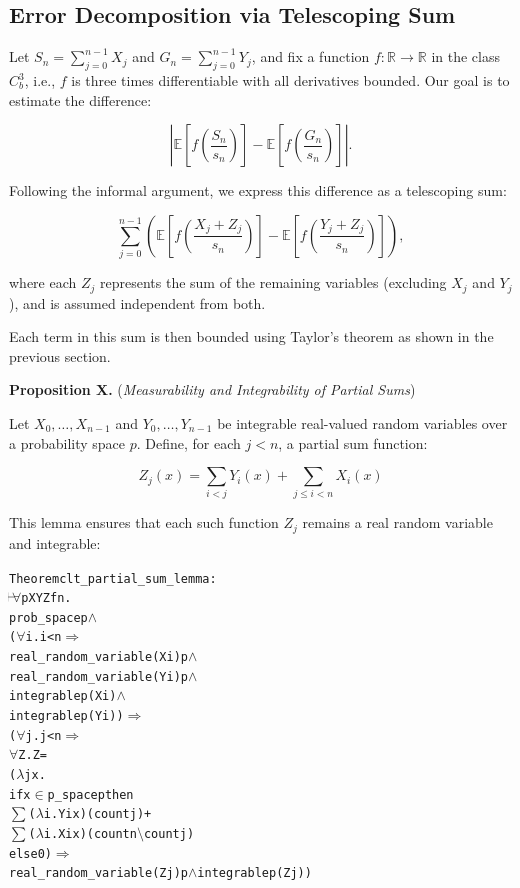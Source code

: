 \subsection{Error Decomposition via Telescoping Sum}

Let $S_n = \sum_{j=0}^{n-1} X_j$ and $G_n = \sum_{j=0}^{n-1} Y_j$, and fix a function $f : \mathbb{R} \to \mathbb{R}$ in the class $C^3_b$, i.e., $f$ is three times differentiable with all derivatives bounded. Our goal is to estimate the difference:

\[
\left| \mathbb{E}\left[f\left(\frac{S_n}{s_n}\right)\right]
     - \mathbb{E}\left[f\left(\frac{G_n}{s_n}\right)\right] \right|.
\]

Following the informal argument, we express this difference as a telescoping sum:

\[
\sum_{j=0}^{n-1} \left(
\mathbb{E}\left[f\left(\frac{X_j + Z_j}{s_n}\right)\right]
-
\mathbb{E}\left[f\left(\frac{Y_j + Z_j}{s_n}\right)\right]
\right),
\]

where each $Z_j$ represents the sum of the remaining variables (excluding $X_j$ and $Y_j$), and is assumed independent from both.

Each term in this sum is then bounded using Taylor's theorem as shown in the previous section.

\textbf{Proposition X.} (\emph{Measurability and Integrability of Partial Sums})

Let $X_0, \dots, X_{n-1}$ and $Y_0, \dots, Y_{n-1}$ be integrable real-valued random variables over a probability space $p$. Define, for each $j < n$, a partial sum function:

\[
Z_j(x) = \sum_{i < j} Y_i(x) + \sum_{j \leq i < n} X_i(x)
\]

This lemma ensures that each such function $Z_j$ remains a real random variable and integrable:

\begin{hol}
\begin{alltt}
Theorem clt\_partial\_sum\_lemma :
\(\!\!\!{\turn}\!\!\!\!\) \(\forall\)p X Y Z f n.
prob\_space p \(\land\)
(\(\forall\)i. i < n \(\Rightarrow\)
  real\_random\_variable (X i) p \(\land\)
  real\_random\_variable (Y i) p \(\land\)
  integrable p (X i) \(\land\)
  integrable p (Y i)) \(\Rightarrow\)
(\(\forall\)j. j < n \(\Rightarrow\)
  \(\forall\)Z. Z =
    (\(\lambda\)j x.
      if x \(\in\) p\_space p then
        \(\sum\) (\(\lambda\)i. Y i x) (count j) +
        \(\sum\) (\(\lambda\)i. X i x) (count n \(\setminus\) count j)
      else 0) \(\Rightarrow\)
    real\_random\_variable (Z j) p \(\land\) integrable p (Z j))
\end{alltt}
\end{hol}

